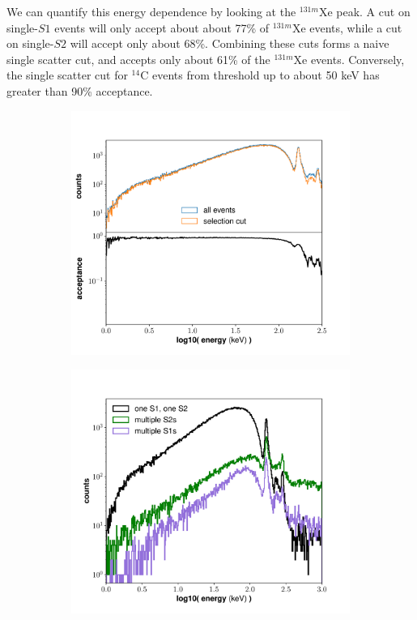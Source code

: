 {We can quantify this energy dependence by looking at the $^{131m}$Xe peak. A cut on single-$S1$ events will only accept about about 77\% of $^{131m}$Xe events, while a cut on single-$S2$ will accept only about 68\%. Combining these cuts forms a naive single scatter cut, and accepts only about 61\% of the $^{131m}$Xe events. Conversely, the single scatter cut for $^{14}$C events from threshold up to about 50 keV has greater than 90\% acceptance.
\begin{figure}[h!]
\centering
\begin{subfigure}{0.5\textwidth}
  \centering
  \includegraphics[width=\textwidth]{Figures/DataSelection_singlescatter}
\end{subfigure}%
\begin{subfigure}{0.5\textwidth}
  \centering
  \includegraphics[width=\textwidth]{Figures/DataSelection_multiS1S2}

\end{subfigure}
\end{figure}}
